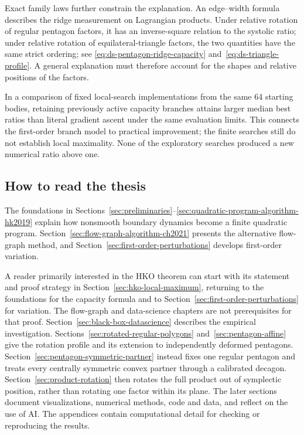 Exact family laws further constrain the explanation. An edge--width formula
describes the ridge measurement on Lagrangian products. Under relative
rotation of regular pentagon factors, it has an inverse-square relation to
the systolic ratio; under relative rotation of equilateral-triangle factors,
the two quantities have the same strict ordering; see
\eqref{eq:ds-pentagon-ridge-capacity} and~\eqref{eq:ds-triangle-profile}.
A general explanation must therefore account
for the shapes and relative positions of the factors.

In a comparison of fixed local-search implementations from the same
64 starting bodies, retaining previously active capacity branches attains larger median best ratios than literal
gradient ascent under the same evaluation limits. This connects the
first-order branch model to practical improvement; the finite searches still
do not establish local maximality. None of the exploratory searches produced
a new numerical ratio above one.

\subsection{How to read the thesis}

The foundations in Sections~\ref{sec:preliminaries}--\ref{sec:quadratic-program-algorithm-hk2019}
explain how nonsmooth boundary dynamics become a finite quadratic program.
Section~\ref{sec:flow-graph-algorithm-ch2021} presents the alternative flow-graph
method, and Section~\ref{sec:first-order-perturbations} develops first-order variation.

A reader primarily interested in the HKO theorem can start with its statement
and proof strategy in Section~\ref{sec:hko-local-maximum}, returning to the
foundations for the capacity formula and to
Section~\ref{sec:first-order-perturbations} for variation. The flow-graph and
data-science chapters are not prerequisites for that proof.
Section~\ref{sec:black-box-datascience} describes the empirical investigation.
Sections~\ref{sec:rotated-regular-polygons} and~\ref{sec:pentagon-affine} give
the rotation profile and its extension to independently deformed pentagons.
Section~\ref{sec:pentagon-symmetric-partner} instead fixes one regular
pentagon and treats every centrally symmetric convex partner through a
calibrated decagon.
Section~\ref{sec:product-rotation} then rotates the full product out of
symplectic position, rather than rotating one factor within its plane.
The later sections document visualizations, numerical methods, code and data,
and reflect on the use of AI. The appendices contain computational detail
for checking or reproducing the results.
